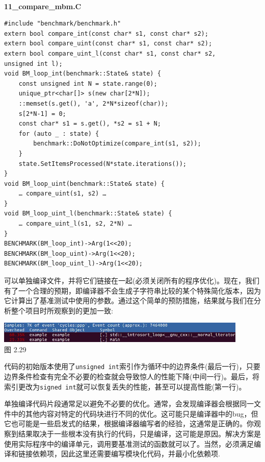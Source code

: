 \hspace*{\fill} \\ %
\noindent
\textbf{11\_compare\_mbm.C}
\begin{lstlisting}[style=styleCXX]
#include "benchmark/benchmark.h"
extern bool compare_int(const char* s1, const char* s2);
extern bool compare_uint(const char* s1, const char* s2);
extern bool compare_uint_l(const char* s1, const char* s2,
unsigned int l);
void BM_loop_int(benchmark::State& state) {
	const unsigned int N = state.range(0);
	unique_ptr<char[]> s(new char[2*N]);
	::memset(s.get(), 'a', 2*N*sizeof(char));
	s[2*N-1] = 0;
	const char* s1 = s.get(), *s2 = s1 + N;
	for (auto _ : state) {
		benchmark::DoNotOptimize(compare_int(s1, s2));
	}
	state.SetItemsProcessed(N*state.iterations());
}
void BM_loop_uint(benchmark::State& state) {
	… compare_uint(s1, s2) …
}
void BM_loop_uint_l(benchmark::State& state) {
	… compare_uint_l(s1, s2, 2*N) …
}
BENCHMARK(BM_loop_int)->Arg(1<<20);
BENCHMARK(BM_loop_uint)->Arg(1<<20);
BENCHMARK(BM_loop_uint_l)->Arg(1<<20);
\end{lstlisting}

可以单独编译文件，并将它们链接在一起(必须关闭所有的程序优化)。现在，我们有了一个合理的预期，即编译器不会生成子字符串比较的某个特殊简化版本，因为它计算出了基准测试中使用的参数。通过这个简单的预防措施，结果就与我们在分析整个项目时所观察到的更加一致:

\begin{center}
\includegraphics[width=0.9\textwidth]{content/1/chapter2/images/29.jpg}\\
图 2.29
\end{center}

代码的初始版本使用了\texttt{unsigned int}索引作为循环中的边界条件(最后一行)，只要边界条件检查有完全不必要的检查就会导致惊人的性能下降(中间一行)。最后，将索引更改为\texttt{signed int}就可以恢复丢失的性能，甚至可以提高性能(第一行)。

单独编译代码片段通常足以避免不必要的优化。通常，会发现编译器会根据同一文件中的其他内容对特定的代码块进行不同的优化。这可能只是编译器中的bug，但它也可能是一些启发式的结果，根据编译器编写者的经验，这通常是正确的。你观察到结果取决于一些根本没有执行的代码，只是编译，这可能是原因。解决方案是使用实际程序中的编译单元，调用要基准测试的函数就可以了。当然，必须满足编译和链接依赖项，因此这里还需要编写模块化代码，并最小化依赖项.

